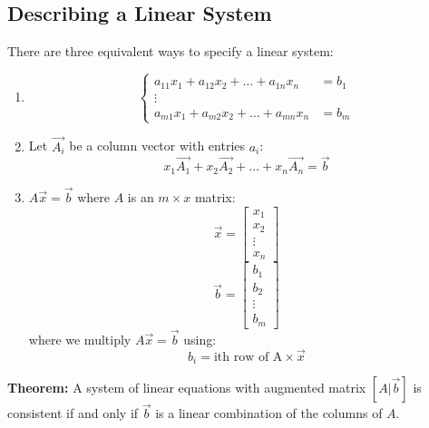 \documentclass[letterpaper, 12pt]{math}
\begin{document}
\subsection*{Describing a Linear System}
There are three equivalent ways to specify a linear system:
\begin{enumerate}
  \item \[ \begin{cases}
    a_{11}x_1+a_{12}x_2+\dots+a_{1n}x_n &= b_1 \\
    \vdots & \\
    a_{m1}x_1+a_{m2}x_2+\dots+a_{mn}x_n &= b_m
  \end{cases} \]
  \item Let \( \vec{A_i} \) be a column vector with entries \( a_i \):
    \[ x_1\vec{A_1}+x_2\vec{A_2}+\dots+x_n\vec{A_n} = \vec{b} \]
  \item \( A\vec{x} = \vec{b} \) where \( A \) is an \( m\times x \) matrix:
    \[ \vec{x} = \begin{bmatrix}x_1 \\ x_2 \\ \vdots \\ x_n\end{bmatrix} \]
    \[ \vec{b} = \begin{bmatrix}b_1 \\ b_2 \\ \vdots \\ b_m\end{bmatrix} \]
    where we multiply \( A\vec{x} = \vec{b} \) using:
    \[ b_i = \text{ith row of A}\times\vec{x} \]
\end{enumerate}
\textbf{Theorem:} A system of linear equations with augmented matrix
\( [A|\vec{b}] \) is consistent if and only if \( \vec{b} \) is a linear
combination of the columns of \( A \).
\end{document}
